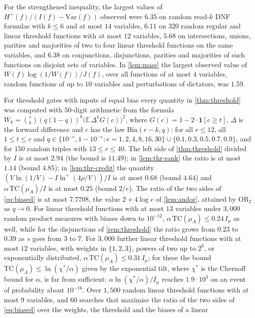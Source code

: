 \documentclass[11pt]{amsart}
\theoremstyle{definition}
\theoremstyle{remark}
\newcommand{\E}{\mathbb{E}}
\newcommand{\Var}{\mathrm{Var}}
\newcommand{\Bin}{\mathrm{Bin}}
\begin{document}
For the strengthened inequality, the largest values of $H^+(f)/(I(f)-\Var(f))$ observed were $6.35$ on random
read-$k$ DNF formulas with $k\le6$ and at most $14$ variables, $6.11$ on $320$ random regular and linear threshold
functions with at most $12$ variables, $5.68$ on intersections, unions, parities and majorities of two to four linear
threshold functions on the same variables, and $6.38$ on conjunctions, disjunctions, parities and majorities of such
functions on disjoint sets of variables. In \cref{lem:mass} the largest observed value of
$W(f)\log(1/W(f))/J(f)$, over all functions of at most $4$ variables, random functions of up to $10$ variables and
perturbations of dictators, was $1.59$.

For threshold gates with inputs of equal bias every quantity in \cref{thm:threshold} was computed with $50$-digit
arithmetic from the formula $W_k=\binom rk(q(1-q))^k\bigl(\E\,\Delta^kG(c)\bigr)^2$, where $G(c)=1-2\cdot\mathbf 1[c\ge t]$,
$\Delta$ is the forward difference and $c$ has the law $\Bin(r-k,q)$: for all $r\le12$, all $1\le t\le r$ and
$q\in\{10^{-e},1-10^{-e}:e=1,2,4,8,16,30\}\cup\{0.1,0.3,0.5,0.7,0.9\}$, and for $150$ random triples with
$13\le r\le40$. The left side of \cref{thm:threshold} divided by $I$ is at most $2.94$ (the bound is $11.49$); in
\cref{lem:thr-rank} the ratio is at most $1.14$ (bound $4.85$); in \cref{lem:thr-credit} the quantity
$(V\ln(1/V)-I\ln^+(4\rho/V))/I$ is at most $0.68$ (bound $4.64$) and $\alpha\,\mathrm{TC}(\mu_A)/I$ is at most $0.25$
(bound $2/e$). The ratio of the two sides of \eqref{eq:biased} is at most $7.7708$, the value $2+4\log e$ of
\cref{lem:andor}, attained by $\mathrm{OR}_2$ as $q\to0$. For linear threshold functions with at most $13$ variables
under $3{,}000$ random product measures with biases down to $10^{-12}$, $\alpha\,\mathrm{TC}(\mu_A)\le0.24\,I_\mu$ as
well, while for the disjunctions of \cref{rem:threshold} the ratio grows from $0.23$ to $0.39$ as $s$ goes from $3$
to $7$. For $3{,}000$ further linear threshold functions with at most $12$ variables, with weights in $\{1,2,3\}$,
powers of two up to $2^6$, or exponentially distributed, $\alpha\,\mathrm{TC}(\mu_A)\le0.31\,I_\mu$; for these the
bound $\mathrm{TC}(\mu_A)\le\ln(\chi^*/\alpha)$ given by the exponential tilt, where $\chi^*$ is the Chernoff bound for
$\alpha$, is far from sufficient: $\alpha\ln(\chi^*/\alpha)/I_\mu$ reaches $1.9\cdot10^3$ on an event of probability
about $10^{-16}$. Over $1{,}500$ random linear threshold functions with at most $9$ variables, and $60$ searches that
maximise the ratio of the two sides of \eqref{eq:biased} over the weights, the threshold and the biases of a linear
\end{document}
